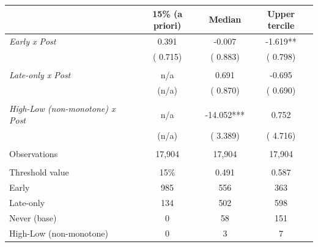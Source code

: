 \begin{tabular}{lccc} \hline \hline
& \multicolumn{1}{c}{15\% (a priori)} & \multicolumn{1}{c}{Median} & \multicolumn{1}{c}{Upper tercile} \\ \toprule
\textit{Early x Post} & 0.391 & -0.007 & -1.619** \\ 
 & (    0.715) & (    0.883) & (    0.798) \\ 
  & & & \\ 
\textit{Late-only x Post} & n/a & 0.691 & -0.695 \\ 
 & (n/a) & (    0.870) & (    0.690) \\ 
  & & & \\ 
\textit{High-Low (non-monotone) x Post} & n/a & -14.052*** & 0.752 \\ 
 & (n/a) & (    3.389) & (    4.716) \\ 
  & & & \\ 
Observations &       17,904 &       17,904 &       17,904 \\ 
  & & & \\ 
Threshold value & 15\% & 0.491 & 0.587 \\ 
Early & 985 & 556 & 363 \\ 
Late-only & 134 & 502 & 598 \\ 
Never (base) & 0 & 58 & 151 \\ 
High-Low (non-monotone) & 0 & 3 & 7 \\ 
\bottomrule
\end{tabular}